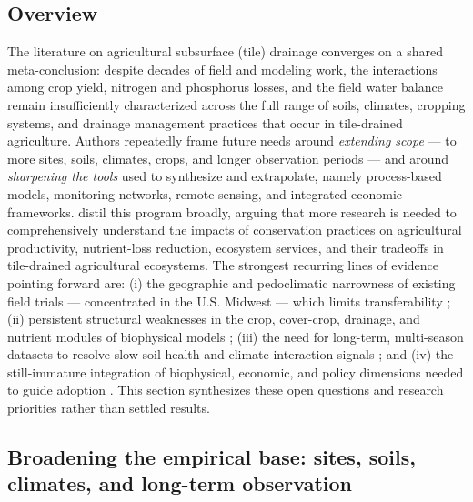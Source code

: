 \subsection{Overview}

The literature on agricultural subsurface (tile) drainage converges on a shared meta-conclusion: despite decades of field and modeling work, the interactions among crop yield, nitrogen and phosphorus losses, and the field water balance remain insufficiently characterized across the full range of soils, climates, cropping systems, and drainage management practices that occur in tile-drained agriculture. Authors repeatedly frame future needs around \emph{extending scope} --- to more sites, soils, climates, crops, and longer observation periods --- and around \emph{sharpening the tools} used to synthesize and extrapolate, namely process-based models, monitoring networks, remote sensing, and integrated economic frameworks. \textcite{Ma2025} distil this program broadly, arguing that more research is needed to comprehensively understand the impacts of conservation practices on agricultural productivity, nutrient-loss reduction, ecosystem services, and their tradeoffs in tile-drained agricultural ecosystems. The strongest recurring lines of evidence pointing forward are: (i) the geographic and pedoclimatic narrowness of existing field trials --- concentrated in the U.S. Midwest --- which limits transferability \parencite{Zhao2016,Birru2023}; (ii) persistent structural weaknesses in the crop, cover-crop, drainage, and nutrient modules of biophysical models \parencite{Dietzel2016,Chatterjee2025,Feyereisen2006}; (iii) the need for long-term, multi-season datasets to resolve slow soil-health and climate-interaction signals \parencite{Kaspar2012,Bawa2023,Saha2024}; and (iv) the still-immature integration of biophysical, economic, and policy dimensions needed to guide adoption \parencite{Ferin2023,Malone2023,Qin2025}. This section synthesizes these open questions and research priorities rather than settled results.

\subsection{Broadening the empirical base: sites, soils, climates, and long-term observation}

